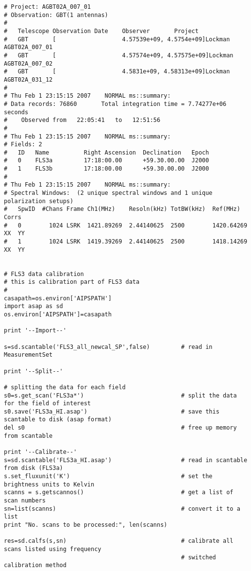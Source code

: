 \small
\begin{verbatim}
# Project: AGBT02A_007_01
# Observation: GBT(1 antennas)
# 
#   Telescope Observation Date    Observer       Project
#   GBT       [                   4.57539e+09, 4.5754e+09]Lockman        AGBT02A_007_01
#   GBT       [                   4.57574e+09, 4.57575e+09]Lockman        AGBT02A_007_02
#   GBT       [                   4.5831e+09, 4.58313e+09]Lockman        AGBT02A_031_12
# 
# Thu Feb 1 23:15:15 2007    NORMAL ms::summary:
# Data records: 76860       Total integration time = 7.74277e+06 seconds
#    Observed from   22:05:41   to   12:51:56
# 
# Thu Feb 1 23:15:15 2007    NORMAL ms::summary:
# Fields: 2
#   ID   Name          Right Ascension  Declination   Epoch
#   0    FLS3a         17:18:00.00      +59.30.00.00  J2000
#   1    FLS3b         17:18:00.00      +59.30.00.00  J2000
# 
# Thu Feb 1 23:15:15 2007    NORMAL ms::summary:
# Spectral Windows:  (2 unique spectral windows and 1 unique polarization setups)
#   SpwID  #Chans Frame Ch1(MHz)    Resoln(kHz) TotBW(kHz)  Ref(MHz)    Corrs
#   0        1024 LSRK  1421.89269  2.44140625  2500        1420.64269  XX  YY
#   1        1024 LSRK  1419.39269  2.44140625  2500        1418.14269  XX  YY


# FLS3 data calibration
# this is calibration part of FLS3 data
#
casapath=os.environ['AIPSPATH']
import asap as sd
os.environ['AIPSPATH']=casapath

print '--Import--'

s=sd.scantable('FLS3_all_newcal_SP',false)         # read in MeasurementSet

print '--Split--'

# splitting the data for each field
s0=s.get_scan('FLS3a*')                            # split the data for the field of interest
s0.save('FLS3a_HI.asap')                           # save this scantable to disk (asap format)
del s0                                             # free up memory from scantable

print '--Calibrate--'
s=sd.scantable('FLS3a_HI.asap')                    # read in scantable from disk (FLS3a)
s.set_fluxunit('K')                                # set the brightness units to Kelvin
scanns = s.getscannos()                            # get a list of scan numbers
sn=list(scanns)                                    # convert it to a list
print "No. scans to be processed:", len(scanns)

res=sd.calfs(s,sn)                                 # calibrate all scans listed using frequency 
                                                   # switched calibration method


\end{verbatim}
